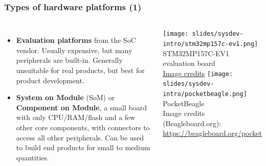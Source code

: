 \begin{frame}
  \frametitle{Types of hardware platforms (1)}
  \begin{columns}
  \begin{itemize}
  \item {\bf Evaluation platforms} from the SoC vendor. Usually
    expensive, but many peripherals are built-in. Generally unsuitable
    for real products, but best for product development.
  \item {\bf System on Module} (SoM) or {\bf Component on Module}, a small
    board with only CPU/RAM/flash and a few other core components, with
    connectors to access all other peripherals. Can be used to build end
    products for small to medium quantities.
  \end{itemize}
    \texttt{[image: slides/sysdev-intro/stm32mp157c-ev1.png]}
    \scriptsize
    STM32MP157C-EV1 evaluation board\\
    \tiny
    \href{https://www.mouser.fr/ProductDetail/STMicroelectronics/STM32MP157C-EV1?qs=9r4v7xj2LnmHBJ35TLmsRg\%3D\%3D}{Image credits}
    \vspace{0.5cm}
    \texttt{[image: slides/sysdev-intro/pocketbeagle.png]}
    \scriptsize
    PocketBeagle\\
    \tiny
    Image credits (Beagleboard.org):\\
    \url{https://beagleboard.org/pocket}
  \end{columns}
\end{frame}


